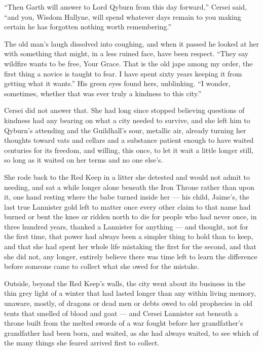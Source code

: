 “Then Garth will answer to Lord Qyburn from this day forward,” Cersei said, “and you, Wisdom Hallyne, will spend whatever days remain to you making certain he has forgotten nothing worth remembering.”

The old man’s laugh dissolved into coughing, and when it passed he looked at her with something that might, in a less ruined face, have been respect. “They say wildfire wants to be free, Your Grace. That is the old jape among my order, the first thing a novice is taught to fear. I have spent sixty years keeping it from getting what it wants.” His green eyes found hers, unblinking. “I wonder, sometimes, whether that was ever truly a kindness to this city.”

Cersei did not answer that. She had long since stopped believing questions of kindness had any bearing on what a city needed to survive, and she left him to Qyburn’s attending and the Guildhall’s sour, metallic air, already turning her thoughts toward vats and cellars and a substance patient enough to have waited centuries for its freedom, and willing, this once, to let it wait a little longer still, so long as it waited on her terms and no one else’s.

She rode back to the Red Keep in a litter she detested and would not admit to needing, and sat a while longer alone beneath the Iron Throne rather than upon it, one hand resting where the babe turned inside her — his child, Jaime’s, the last true Lannister gold left to matter once every other claim to that name had burned or bent the knee or ridden north to die for people who had never once, in three hundred years, thanked a Lannister for anything — and thought, not for the first time, that power had always been a simpler thing to hold than to keep, and that she had spent her whole life mistaking the first for the second, and that she did not, any longer, entirely believe there was time left to learn the difference before someone came to collect what she owed for the mistake.

Outside, beyond the Red Keep’s walls, the city went about its business in the thin grey light of a winter that had lasted longer than any within living memory, unaware, mostly, of dragons or dead men or debts owed to old prophecies in old tents that smelled of blood and goat — and Cersei Lannister sat beneath a throne built from the melted swords of a war fought before her grandfather’s grandfather had been born, and waited, as she had always waited, to see which of the many things she feared arrived first to collect.